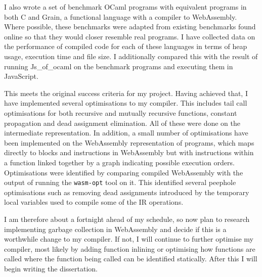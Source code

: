 \documentclass[a4paper,12pt,twoside]{report} %
\begin{document}
I also wrote a set of benchmark OCaml programs with equivalent programs in both C and Grain, a functional language with a compiler to WebAssembly.
Where possible, these benchmarks were adapted from existing benchmarks found online so that they would closer resemble real programs.
I have collected data on the performance of compiled code for each of these languages in terms of heap usage, execution time and file size. I additionally compared this with the result of running Js\_of\_ocaml on the benchmark programs and executing them in JavaScript.


This meets the original success criteria for my project. Having achieved that, I have implemented several optimisations to my compiler. This includes tail call optimisations for both recursive and mutually recursive functions, constant propagation and dead assignment elimination. All of these were done on the intermediate representation. In addition, a small number of optimisations have been implemented on the WebAssembly representation of programs, which maps directly to blocks and instructions in WebAssembly but with instructions within a function linked together by a graph indicating possible execution orders. Optimisations were identified by comparing compiled WebAssembly with the output of running the \verb|wasm-opt| tool on it. This identified several peephole optimisations such as removing dead assignments introduced by the temporary local variables used to compile some of the IR operations.


I am therefore about a fortnight ahead of my schedule, so now plan to research implementing garbage collection in WebAssembly and decide if this is a worthwhile change to my compiler. If not, I will continue to further optimise my compiler, most likely by adding function inlining or optimising how functions are called where the function being called can be identified statically. After this I will begin writing the dissertation.

 
\end{document}

